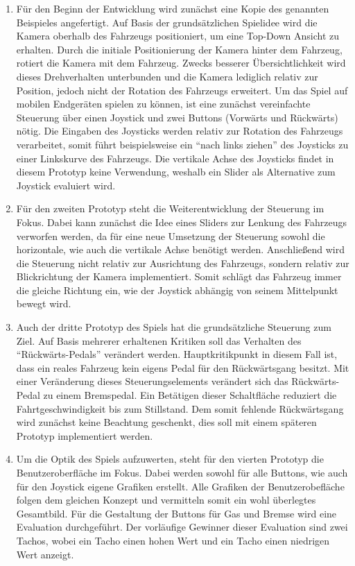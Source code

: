 	\begin{enumerate}[label=Prototyp \arabic*]
		\item{ Für den Beginn der Entwicklung wird zunächst eine Kopie des genannten Beispieles angefertigt. Auf Basis der grundsätzlichen Spielidee wird die Kamera oberhalb des Fahrzeugs positioniert, um eine Top-Down Ansicht zu erhalten. Durch die initiale Positionierung der Kamera hinter dem Fahrzeug, rotiert die Kamera mit dem Fahrzeug. Zwecks besserer Übersichtlichkeit wird dieses Drehverhalten unterbunden und die Kamera lediglich relativ zur Position, jedoch nicht der Rotation des Fahrzeugs erweitert. Um das Spiel auf mobilen Endgeräten spielen zu können, ist eine zunächst vereinfachte Steuerung über einen Joystick und zwei Buttons (Vorwärts und Rückwärts) nötig. Die Eingaben des Joysticks werden relativ zur Rotation des Fahrzeugs verarbeitet, somit führt beispielsweise ein \enquote{nach links ziehen} des Joysticks zu einer Linkskurve des Fahrzeugs. Die vertikale Achse des Joysticks findet in diesem Prototyp keine Verwendung, weshalb ein Slider als Alternative zum Joystick evaluiert wird. }
		\item{ Für den zweiten Prototyp steht die Weiterentwicklung der Steuerung im Fokus. Dabei kann zunächst die Idee eines Sliders zur Lenkung des Fahrzeugs verworfen werden, da für eine neue Umsetzung der Steuerung sowohl die horizontale, wie auch die vertikale Achse benötigt werden. Anschließend wird die Steuerung nicht relativ zur Ausrichtung des Fahrzeugs, sondern relativ zur Blickrichtung der Kamera implementiert. Somit schlägt das Fahrzeug immer die gleiche Richtung ein, wie der Joystick abhängig von seinem Mittelpunkt bewegt wird.}
		\item{ Auch der dritte Prototyp des Spiels hat die grundsätzliche Steuerung zum Ziel. Auf Basis mehrerer erhaltenen Kritiken soll das Verhalten des \enquote{Rückwärts-Pedals} verändert werden. Hauptkritikpunkt in diesem Fall ist, dass ein reales Fahrzeug kein eigens Pedal für den Rückwärtsgang besitzt. Mit einer Veränderung dieses Steuerungselements verändert sich das Rückwärts-Pedal zu einem Bremspedal. Ein Betätigen dieser Schaltfläche reduziert die Fahrtgeschwindigkeit bis zum Stillstand. Dem somit fehlende Rückwärtsgang wird zunächst keine Beachtung geschenkt, dies soll mit einem späteren Prototyp implementiert werden.}
		\item{ Um die Optik des Spiels aufzuwerten, steht für den vierten Prototyp die Benutzeroberfläche im Fokus. Dabei werden sowohl für alle Buttons, wie auch für den Joystick eigene Grafiken erstellt. Alle Grafiken der Benutzerobefläche folgen dem gleichen Konzept und vermitteln somit ein wohl überlegtes Gesamtbild. Für die Gestaltung der Buttons für Gas und Bremse wird eine Evaluation durchgeführt. Der vorläufige Gewinner dieser Evaluation sind zwei Tachos, wobei ein Tacho einen hohen Wert und ein Tacho einen niedrigen Wert anzeigt. }

\end{enumerate}
